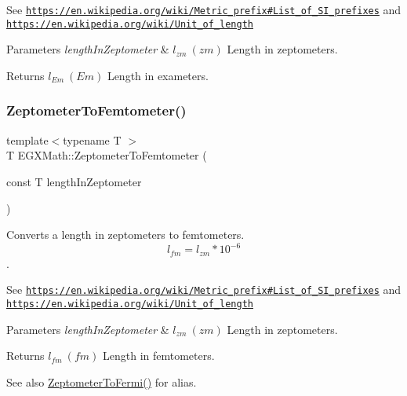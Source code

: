 See \href{https://en.wikipedia.org/wiki/Metric_prefix#List_of_SI_prefixes}{\tt https\+://en.\+wikipedia.\+org/wiki/\+Metric\+\_\+prefix\#\+List\+\_\+of\+\_\+\+S\+I\+\_\+prefixes} and \href{https://en.wikipedia.org/wiki/Unit_of_length}{\tt https\+://en.\+wikipedia.\+org/wiki/\+Unit\+\_\+of\+\_\+length} 
\begin{DoxyParams}{Parameters}
{\em length\+In\+Zeptometer} & $ l_{zm}\ (zm)$ Length in zeptometers. \\
\hline
\end{DoxyParams}
\begin{DoxyReturn}{Returns}
$ l_{Em}\ (Em)$ Length in exameters. 
\end{DoxyReturn}
\mbox{\label{group___e_g_x_math-_conversions-_length_conversions-_zeptometer-_s_i_ga8975921335cca63259a2c02edfb39c00}} 
\subsubsection{\texorpdfstring{Zeptometer\+To\+Femtometer()}{ZeptometerToFemtometer()}}
{\footnotesize\ttfamily template$<$typename T $>$ \\
T E\+G\+X\+Math\+::\+Zeptometer\+To\+Femtometer (\begin{DoxyParamCaption}\item[{const T}]{length\+In\+Zeptometer }\end{DoxyParamCaption})}



Converts a length in zeptometers to femtometers. \[ l_{fm}=l_{zm} * 10^{-6} \]. 

See \href{https://en.wikipedia.org/wiki/Metric_prefix#List_of_SI_prefixes}{\tt https\+://en.\+wikipedia.\+org/wiki/\+Metric\+\_\+prefix\#\+List\+\_\+of\+\_\+\+S\+I\+\_\+prefixes} and \href{https://en.wikipedia.org/wiki/Unit_of_length}{\tt https\+://en.\+wikipedia.\+org/wiki/\+Unit\+\_\+of\+\_\+length} 
\begin{DoxyParams}{Parameters}
{\em length\+In\+Zeptometer} & $ l_{zm}\ (zm)$ Length in zeptometers. \\
\hline
\end{DoxyParams}
\begin{DoxyReturn}{Returns}
$ l_{fm}\ (fm)$ Length in femtometers. 
\end{DoxyReturn}
\begin{DoxySeeAlso}{See also}
\mbox{\hyperlink{group___e_g_x_math-_conversions-_length_conversions-_zeptometer-_non-_s_i_ga15c5cde158a9916cc01d998c7abc38c4}{Zeptometer\+To\+Fermi()}} for alias. 
\end{DoxySeeAlso}
\mbox{\label{group___e_g_x_math-_conversions-_length_conversions-_zeptometer-_s_i_ga730e0331ec8efc46b557692f5f515d03}} 
